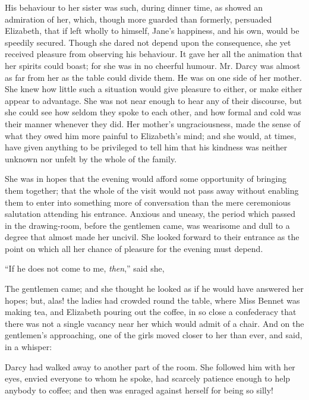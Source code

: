 His behaviour to her sister was such, during dinner time, as showed an admiration of her, which, though more guarded than formerly, persuaded Elizabeth, that if left wholly to himself, Jane's happiness, and his own, would be speedily secured. Though she dared not depend upon the consequence, she yet received pleasure from observing his behaviour. It gave her all the animation that her spirits could boast; for she was in no cheerful humour. Mr. Darcy was almost as far from her as the table could divide them. He was on one side of her mother. She knew how little such a situation would give pleasure to either, or make either appear to advantage. She was not near enough to hear any of their discourse, but she could see how seldom they spoke to each other, and how formal and cold was their manner whenever they did. Her mother's ungraciousness, made the sense of what they owed him more painful to Elizabeth's mind; and she would, at times, have given anything to be privileged to tell him that his kindness was neither unknown nor unfelt by the whole of the family.

She was in hopes that the evening would afford some opportunity of bringing them together; that the whole of the visit would not pass away without enabling them to enter into something more of conversation than the mere ceremonious salutation attending his entrance. Anxious and uneasy, the period which passed in the drawing-room, before the gentlemen came, was wearisome and dull to a degree that almost made her uncivil. She looked forward to their entrance as the point on which all her chance of pleasure for the evening must depend.

“If he does not come to me, {\em then},” said she, 

The gentlemen came; and she thought he looked as if he would have answered her hopes; but, alas! the ladies had crowded round the table, where Miss Bennet was making tea, and Elizabeth pouring out the coffee, in so close a confederacy that there was not a single vacancy near her which would admit of a chair. And on the gentlemen's approaching, one of the girls moved closer to her than ever, and said, in a whisper:


Darcy had walked away to another part of the room. She followed him with her eyes, envied everyone to whom he spoke, had scarcely patience enough to help anybody to coffee; and then was enraged against herself for being so silly!

